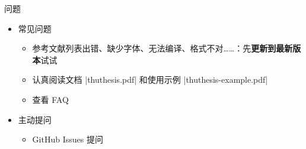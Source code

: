 \begin{frame}[fragile]{\ThuThesis 问题}
    \begin{itemize}
      \item 常见问题
        \begin{itemize}
          \item 参考文献列表出错、缺少字体、无法编译、格式不对……：先\textbf{更新到最新版本}试试
          \item 认真阅读文档 |thuthesis.pdf| 和使用示例 |thuthesis-example.pdf|
          \item 查看 FAQ 
        \end{itemize}
      \item 主动提问
        \begin{itemize}
          \item GitHub Issues 提问 
        \end{itemize}
    \end{itemize}
\end{frame}



